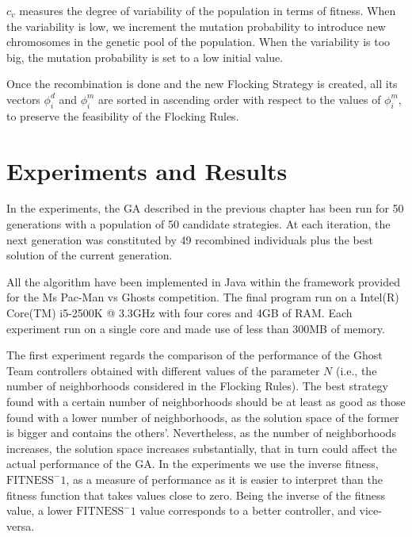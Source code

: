 \documentclass{llncs}
\begin{document}
$c_v$ measures the degree of variability of the population in terms of fitness. When the variability is low, we increment the mutation probability to introduce new chromosomes in the genetic pool of the population. When the variability is too big, the mutation probability is set to a low initial value.

Once the recombination is done and the new Flocking Strategy is created, all its vectors $\phi^d_i$ and $\phi^m_i $ are sorted in ascending order with respect to the values of $\phi^m_i $, to preserve the feasibility of the Flocking Rules.

%
%

\section{Experiments and Results}
\label{sec:experiments}

In the experiments, the GA described in the previous chapter has been run for 50 generations with a population of 50 candidate strategies. At each iteration, the next generation was constituted by 49 recombined individuals plus the best solution of the current generation.

All the algorithm have been implemented in Java within the framework provided for the Ms Pac-Man vs Ghosts competition. The final program run on a Intel(R) Core(TM) i5-2500K @ 3.3GHz with four cores and 4GB of RAM. Each experiment run on a single core and made use of less than 300MB of memory.

The first experiment regards the comparison of the performance of the Ghost Team controllers obtained with different values of the parameter $N$ (i.e., the number of neighborhoods considered in the Flocking Rules). The best strategy found with a certain number of neighborhoods should be at least as good as those found with a lower number of neighborhoods, as the solution space of the former is bigger and contains the others'. Nevertheless, as the number of neighborhoods increases, the solution space increases substantially, that in turn could affect the actual performance of the GA. In the experiments we use the inverse fitness, $\mathrm{FITNESS}^-1$, as a measure of performance as it is easier to interpret than the fitness function that takes values close to zero. Being the inverse of the fitness value, a lower $\mathrm{FITNESS}^-1$ value corresponds to a better controller, and vice-versa. 
\end{document}
